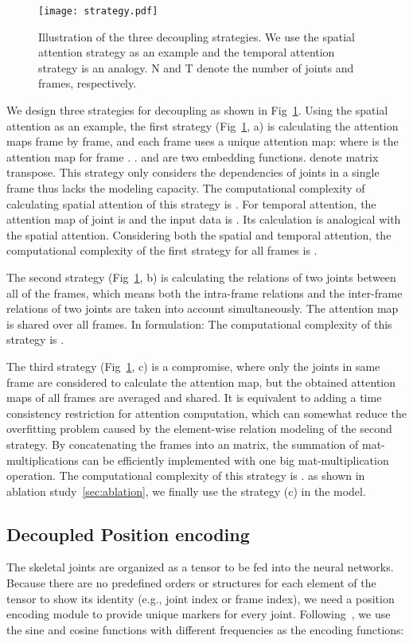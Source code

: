 \documentclass[runningheads]{llncs}
\begin{document}
\begin{figure}[tp]
    \centering
    \texttt{[image: strategy.pdf]}
    \caption{Illustration of the three decoupling strategies. We use the spatial attention strategy as an example and the temporal attention strategy is an analogy. N and T denote the number of joints and frames, respectively.}
    \label{fig:strategy}
\end{figure}{}

We design three strategies for decoupling as shown in Fig~\ref{fig:strategy}. 
Using the spatial attention as an example, the first strategy (Fig~\ref{fig:strategy}, a) is calculating the attention maps frame by frame, and each frame uses a unique attention map:
{}
where  is the attention map for frame . .  and  are two embedding functions.  denote matrix transpose. 
This strategy only considers the dependencies of joints in a single frame thus lacks the modeling capacity. 
The computational complexity of calculating spatial attention of this strategy is . 
For temporal attention, the attention map of joint  is  and the input data is . 
Its calculation is analogical with the spatial attention. 
Considering both the spatial and temporal attention, the computational complexity of the first strategy for all frames is .


The second strategy (Fig~\ref{fig:strategy}, b) is calculating the relations of two joints between all of the frames, which means both the intra-frame relations and the inter-frame relations of two joints are taken into account simultaneously. 
The attention map is shared over all frames. 
In formulation: 
{}
The computational complexity of this strategy is .


The third strategy (Fig~\ref{fig:strategy}, c) is a compromise, where only the joints in same frame are considered to calculate the attention map, but the obtained attention maps of all frames are averaged and shared.
It is equivalent to adding a time consistency restriction for attention computation, which can somewhat reduce the overfitting problem caused by the element-wise relation modeling of the second strategy.
{}
By concatenating the frames into an  matrix, the summation of mat-multiplications can be efficiently implemented with one big mat-multiplication operation. 
The computational complexity of this strategy is .
as shown in ablation study~\ref{sec:ablation}, we finally use the strategy (c) in the model.

\subsection{Decoupled Position encoding}
\label{sec:positionencoding}
The skeletal joints are organized as a tensor to be fed into the neural networks. 
Because there are no predefined orders or structures for each element of the tensor to show its identity (e.g., joint index or frame index), we need a position encoding module to provide unique markers for every joint. 
Following~\cite{vaswani_attention_2017}, we use the sine and cosine functions with different frequencies as the encoding functions: 
\end{document}
